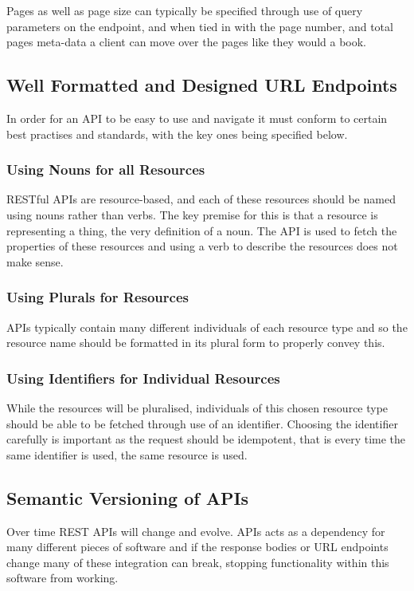 Pages as well as page size can typically be specified through use of query parameters on the endpoint, and when tied in with the page number, and total pages meta-data a client can move over the pages like they would a book.
\subsection{Well Formatted and Designed URL Endpoints}
In order for an API to be easy to use and navigate it must conform to certain best practises and standards, with the key ones  being specified below.
\subsubsection{Using Nouns for all Resources}
RESTful APIs are resource-based, and each of these resources should be named using nouns rather than verbs. The key premise for this is that a resource is representing a thing, the very definition of a noun. The API is used to fetch the properties of these resources and using a verb to describe the resources does not make sense.
\subsubsection{Using Plurals for Resources}
APIs typically contain many different individuals of each resource type and so the resource name should be formatted in its plural form to properly convey this.
\subsubsection{Using Identifiers for Individual Resources}
While the resources will be pluralised, individuals of this chosen resource type should be able to be fetched through use of an identifier. Choosing the identifier carefully is important as the request should be idempotent, that is every time the same identifier is used, the same resource is used.
\subsection{Semantic Versioning of APIs}
Over time REST APIs will change and evolve. APIs acts as a dependency for many different pieces of software and if the response bodies or URL endpoints change many of these integration can break, stopping functionality within this software from working.

